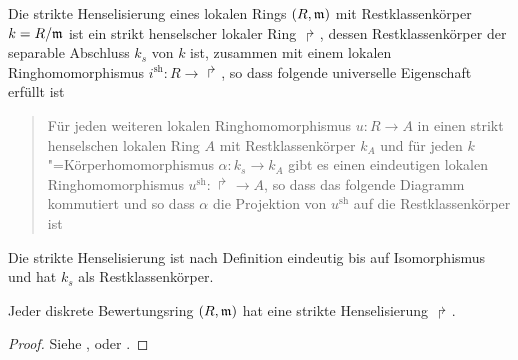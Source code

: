 
\begin{Definition}\label{def:striktehenselisierung}
  Die strikte Henselisierung eines lokalen Rings $(R,\mathfrak{m})$ mit
  Restklassenkörper $k=R/\mathfrak{m}$ ist ein strikt henselscher lokaler Ring
  $\Rsh$, dessen Restklassenkörper der separable Abschluss $k_s$ von
  $k$ ist, zusammen mit einem lokalen Ringhomomorphismus
  $i^\text{sh}\colon R\to\Rsh$, so dass folgende universelle
  Eigenschaft erfüllt ist
  \begin{quote}
    Für jeden weiteren lokalen Ringhomomorphismus $u\colon R\to A$ in
    einen strikt henselschen lokalen Ring $A$ mit Restklassenkörper
    $k_A$ und für jeden $k$"=Körperhomomorphismus $\alpha\colon k_s\to k_A$
    gibt es einen eindeutigen lokalen Ringhomomorphismus
    $u^\text{sh}\colon\Rsh\to A$, so dass das folgende Diagramm
    kommutiert und so dass $\alpha$ die Projektion von $u^\text{sh}$
    auf die Restklassenkörper ist
    \begin{center}
    \end{center}
  \end{quote}
  Die strikte Henselisierung ist nach Definition eindeutig bis auf
  Isomorphismus und hat $k_s$ als Restklassenkörper.
\end{Definition}

\begin{Satz}
  \label{thm:exhenselisierung}
  Jeder diskrete Bewertungsring $(R,\mathfrak{m})$ hat eine
  strikte Henselisierung $\Rsh$.
  \begin{proof}
    Siehe
    \cite[Proposition IV.6.5]{silverman2},
    \cite[Remark IV.6.6.2]{silverman2}
    oder \cite[Chapter 2.3, S. 48]{neron}.
  \end{proof}
\end{Satz}

